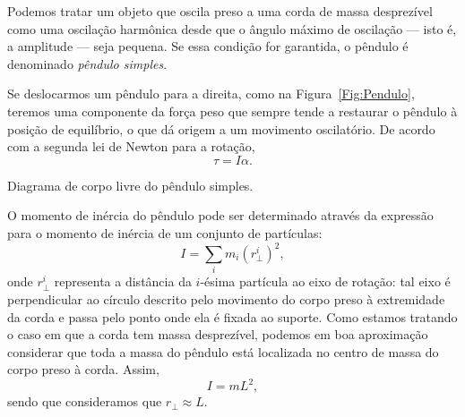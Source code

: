 Podemos tratar um objeto que oscila preso a uma corda de massa desprezível como uma oscilação harmônica desde que o ângulo máximo de oscilação --- isto é, a amplitude --- seja pequena. Se essa condição for garantida, o pêndulo é denominado \emph{pêndulo simples}.

Se deslocarmos um pêndulo para a direita, como na Figura~\ref{Fig:Pendulo}, teremos uma componente da força peso que sempre tende a restaurar o pêndulo à posição de equilíbrio, o que dá origem a um movimento oscilatório. De acordo com a segunda lei de Newton para a rotação,
\begin{equation}
    \tau = I\alpha.
\end{equation}

\begin{marginfigure}[1cm]
\centering
{}
\caption{Diagrama de corpo livre do pêndulo simples.}
\label{Fig:Pendulo}
\end{marginfigure}

O momento de inércia do pêndulo pode ser determinado através da expressão para o momento de inércia de um conjunto de partículas:
\begin{equation}
    I = \sum_i m_i (r_\perp^i)^2,
\end{equation}
%
onde $r_\perp^i$ representa a distância da $i$-ésima partícula ao eixo de rotação: tal eixo é perpendicular ao círculo descrito pelo movimento do corpo preso à extremidade da corda e passa pelo ponto onde ela é fixada ao suporte. Como estamos tratando o caso em que a corda tem massa desprezível, podemos em boa aproximação considerar que toda a massa do pêndulo está localizada no centro de massa do corpo preso à corda. Assim,
\begin{equation}
    I = m L^2,
\end{equation}
%
sendo que consideramos que $r_\perp \approx L$.

